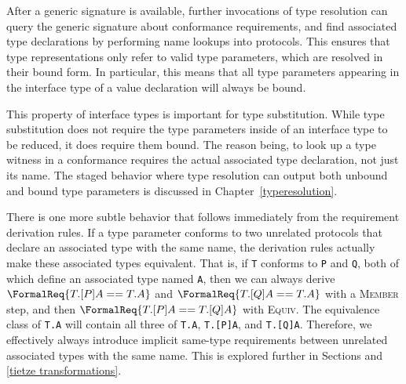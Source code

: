 \documentclass[../generics]{subfiles}
\begin{document}
After a generic signature is available, further invocations of type resolution can query the generic signature about conformance requirements, and find associated type declarations by performing name lookups into protocols. This ensures that type representations only refer to valid type parameters, which are resolved in their bound form. In particular, this means that all type parameters appearing in the interface type of a value declaration will always be bound.

This property of interface types is important for type substitution. While type substitution does not require the type parameters inside of an interface type to be reduced, it does require them bound. The reason being, to look up a type witness in a conformance requires the actual associated type declaration, not just its name. The staged behavior where type resolution can output both unbound and bound type parameters is discussed in Chapter~\ref{typeresolution}.

There is one more subtle behavior that follows immediately from the requirement derivation rules. If a type parameter conforms to two unrelated protocols that declare an associated type with the same name, the derivation rules actually make these associated types equivalent. That is, if \texttt{T} conforms to \texttt{P} and \texttt{Q}, both of which define an associated type named \texttt{A}, then we can always derive $\FormalReq{T.[P]A == T.A}$ and $\FormalReq{T.[Q]A == T.A}$ with a \textsc{Member} step, and then $\FormalReq{T.[P]A == T.[Q]A}$ with \textsc{Equiv}. The equivalence class of \texttt{T.A} will contain all three of \verb|T.A|, \verb|T.[P]A|, and \verb|T.[Q]A|. Therefore, we effectively always introduce implicit  same-type requirements between unrelated associated types with the same name. This is explored further in Sections and \ref{tietze transformations}.
\end{document}
